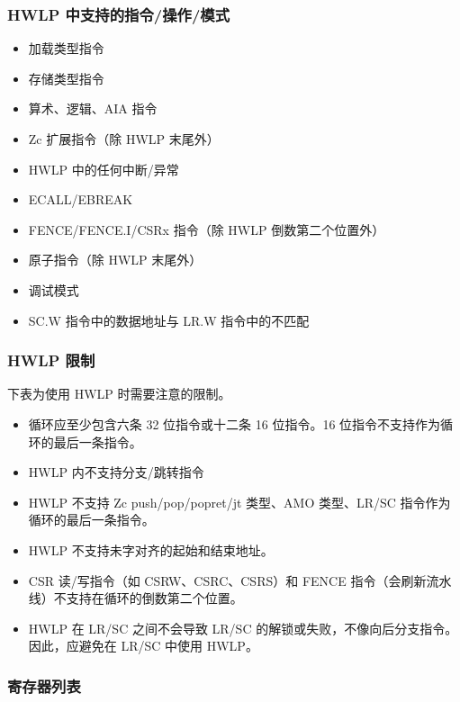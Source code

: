\documentclass[main\_\_CN.tex]{subfiles}
\begin{document}
\subsubsection{HWLP 中支持的指令/操作/模式}
\label{sec:riscvcpu-hwloop-inst}

\begin{itemize}
    \item 加载类型指令
    \item 存储类型指令
    \item 算术、逻辑、AIA 指令
    \item Zc 扩展指令（除 HWLP 末尾外）
    \item HWLP 中的任何中断/异常
    \item ECALL/EBREAK
    \item FENCE/FENCE.I/CSRx 指令（除 HWLP 倒数第二个位置外）
    \item 原子指令（除 HWLP 末尾外）
    \item 调试模式
    \item SC.W 指令中的数据地址与 LR.W 指令中的不匹配
\end{itemize}

\subsubsection{HWLP 限制}
\label{sec:riscvcpu-hwloop-constraints}

下表为使用 HWLP 时需要注意的限制。

\begin{itemize}
\item 循环应至少包含六条 32 位指令或十二条 16 位指令。16 位指令不支持作为循环的最后一条指令。
\item HWLP 内不支持分支/跳转指令
\item HWLP 不支持 Zc push/pop/popret/jt 类型、AMO 类型、LR/SC 指令作为循环的最后一条指令。
\item HWLP 不支持未字对齐的起始和结束地址。
\item CSR 读/写指令（如 CSRW、CSRC、CSRS）和 FENCE 指令（会刷新流水线）不支持在循环的倒数第二个位置。
\item HWLP 在 LR/SC 之间不会导致 LR/SC 的解锁或失败，不像向后分支指令。因此，应避免在 LR/SC 中使用 HWLP。
\end{itemize}

\subsubsection{寄存器列表}
\label{sec:riscvcpu-hwloop-reg-summ}
\end{document}
